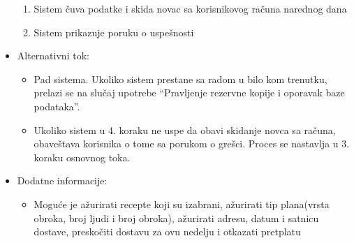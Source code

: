 \begin{itemize}
\begin{enumerate}
            \item Sistem čuva podatke i skida novac sa korisnikovog računa narednog dana
            \item Sistem prikazuje poruku o uspešnosti 
        \end{enumerate}
    \item Alternativni tok:
        \begin{itemize}
            \item Pad sistema. Ukoliko sistem prestane sa radom u bilo kom trenutku, prelazi se na slučaj upotrebe ``Pravljenje rezervne kopije i oporavak baze podataka''.
            \item Ukoliko sistem u 4. koraku ne uspe da obavi skidanje novca sa računa, obaveštava korisnika o tome sa porukom o grešci. Proces se nastavlja u 3. koraku osnovnog toka.
        \end{itemize}
    \item Dodatne informacije:
        \begin{itemize}
            \item Moguće je ažurirati recepte koji su izabrani, ažurirati tip plana(vrsta obroka, broj ljudi i broj obroka), ažurirati adresu, datum i satnicu dostave, preskočiti dostavu za ovu nedelju i otkazati pretplatu 
        \end{itemize}
\end{itemize}

